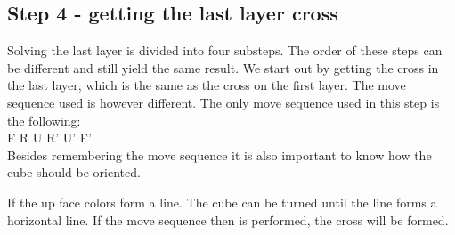 \subsection{Step 4 - getting the last layer cross}
Solving the last layer is divided into four substeps. The order of these steps can be different and still yield the same result. We start out by getting the cross in the last layer, which is the same as the cross on the first layer. The move sequence used is however different. The only move sequence used in this step is the following: \\

F R U R' U' F' \\

Besides remembering the move sequence it is also important to know how the cube should be oriented.

If the up face colors form a line. The cube can be turned until the line forms a horizontal line. If the move sequence then is performed, the cross will be formed.

\begin{figure}[htb]
	\centering
		\hspace{0.02\textwidth}
		\hspace{0.02\textwidth}
		\caption{}
		\label{fig:cross}
\end{figure}

